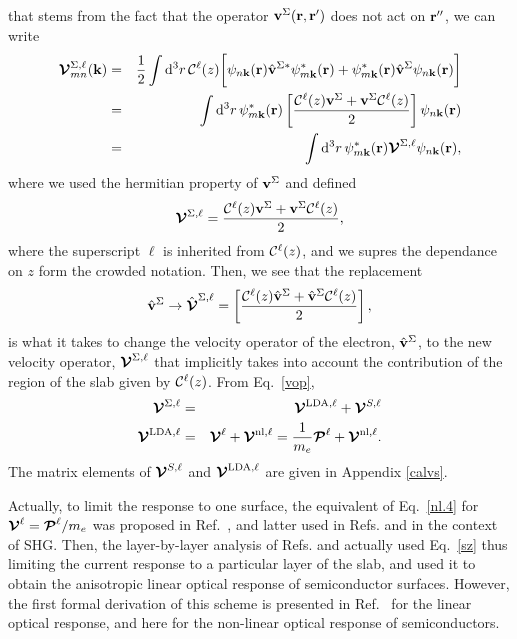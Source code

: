 \documentclass[floatfix,prb,aps,superscriptaddress,11pt,preprint]{revtex4}
\begin{document}
that stems from the fact that the operator $\mathbf{v}^\Sigma(\mathbf{r},\mathbf{r}')$ does not act on
$\mathbf{r}''$, we can write
\begin{eqnarray}\label{nl.3}
\boldsymbol{\mathcal{\cal V}}^{\Sigma,\ell}_{mn}({\mathbf k})
&=&
\frac{1}{2}
\int \mathrm{d}^3 r\,
 {\mathbf{\cal C}}^\ell(z)
 \bigg[
\psi_{n\mathbf{k}}(\mathbf{r})
\hat{\mathbf{v}}^{\Sigma *}\psi^*_{m\mathbf{k}}(\mathbf{r})
+ 
\psi^*_{m\mathbf{k}}(\mathbf{r})\hat{\mathbf{v}}^\Sigma
\psi_{n\mathbf{k}}(\mathbf{r})
\bigg]
\nonumber\\
&=&
\int \mathrm{d}^3 r\,
\psi^*_{m\mathbf{k}}(\mathbf{r})
\left[\frac{{\mathbf{\cal C}}^\ell(z) \mathbf{v}^\Sigma +
\mathbf{v}^\Sigma {\mathbf{\cal C}}^\ell(z)}{2}\right]
\psi_{n\mathbf{k}}(\mathbf{r})
\nonumber\\
&=&
\int \mathrm{d}^3 r\,
\psi^*_{m\mathbf{k}}(\mathbf{r})
\boldsymbol{\mathcal{\cal V}}^{\Sigma,\ell}
\psi_{n\mathbf{k}}(\mathbf{r})
,
\end{eqnarray}
where we used the hermitian property of $\mathbf{v}^\Sigma$ and  defined
\begin{eqnarray}\label{nl.4}
\boldsymbol{\mathcal{\cal V}}^{\Sigma,\ell}
=
\frac{{\mathbf{\cal C}}^\ell(z) \mathbf{v}^\Sigma +
\mathbf{v}^\Sigma {\mathbf{\cal C}}^\ell(z)}{2}
,
\end{eqnarray} 
where the superscript $\ell$ is inherited from ${\mathbf{\cal C}}^\ell(z)$, and we
supres the dependance on $z$ form the crowded notation.  
Then,
we see that the replacement
\begin{eqnarray}\label{vcali}
\hat{\mathbf{v}}^\Sigma \to \hat{\boldsymbol{\mathcal{\cal V}}}^{\Sigma,\ell}=\left[\frac{{\mathbf{\cal C}}^\ell(z) \hat{\mathbf{v}}^\Sigma +
\hat{\mathbf{v}}^\Sigma {\mathbf{\cal C}}^\ell(z)}{2}\right]
,
\end{eqnarray} 
is what it takes to change the
velocity operator of the electron, $\hat{\mathbf{v}}^\Sigma$, to the new velocity
operator, $\boldsymbol{\mathcal{\cal V}}^{\Sigma,\ell}$
 that implicitly takes into account the
contribution of the region of the slab given by ${\mathbf{\cal C}}^\ell(z)$.
From Eq.~\eqref{vop},
\begin{eqnarray}\label{vopii}
\boldsymbol{\mathcal{\cal V}}^{\Sigma,\ell}
&=&
\boldsymbol{\mathcal{\cal V}}^{\mathrm{LDA},\ell}
+
\boldsymbol{\mathcal{\cal V}}^{S,\ell}
\nonumber\\
\boldsymbol{\mathcal{\cal V}}^{\mathrm{LDA},\ell}
&=&
\boldsymbol{\mathcal{\cal V}}^{\ell}
+
\boldsymbol{\mathcal{\cal V}}^{\mathrm{nl},\ell}
=
\frac{1}{m_e}
\boldsymbol{\mathcal{\cal P}}^{\ell}
+
\boldsymbol{\mathcal{\cal V}}^{\mathrm{nl},\ell}
.
\end{eqnarray}
The matrix elements of $\boldsymbol{\mathcal{\cal V}}^{S,\ell}$ and $\boldsymbol{\mathcal{\cal V}}^{\mathrm{LDA},\ell}$
are given in 
Appendix \ref{calvs}.

Actually, 
to limit the response to one surface, 
the equivalent of Eq.~\eqref{nl.4} for $\boldsymbol{\mathcal{\cal V}}^\ell=\boldsymbol{\mathcal{\cal P}}^\ell/m_e$
 was proposed 
in Ref.~, and latter used in Refs.
and  in the context of SHG. Then, 
the layer-by-layer analysis of Refs.  
and 
actually used Eq.~\eqref{sz}
thus limiting the current response
to a particular layer of the slab, and used it to obtain the
anisotropic linear optical response of semiconductor surfaces.
However, the first formal derivation of this scheme is presented in
Ref.~ for the linear optical response, and
here for the non-linear optical response of semiconductors.
\end{document}
